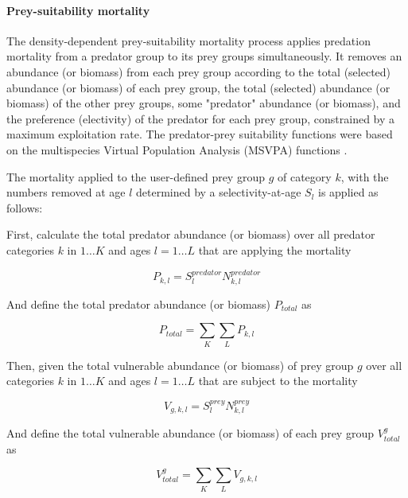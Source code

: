 \paragraph{Prey-suitability mortality}\label{sec:Process-MortalityPreySuitability} 

The density-dependent prey-suitability mortality process applies predation mortality from a predator group to its prey groups simultaneously. It removes an abundance (or biomass) from each prey group according to the total (selected) abundance (or biomass) of each prey group, the total (selected) abundance (or biomass) of the other prey groups, some "predator" abundance (or biomass), and the preference (electivity) of the predator for each prey group, constrained by a maximum exploitation rate. The predator-prey suitability functions were based on the multispecies Virtual Population Analysis (MSVPA) functions \citep{JuradoMolina2005}.

The mortality applied to the user-defined prey group $g$ of category $k$, with the numbers removed at age $l$ determined by a selectivity-at-age $S_l$ is applied as follows:

First, calculate the total predator abundance (or biomass) over all predator categories $k$ in $1 \ldots K$ and ages $l = 1 \ldots L$ that are applying the mortality

\begin{equation}
P_{k,l} = S^{predator}_l N^{predator}_{k,l}
\end{equation}

And define the total predator abundance (or biomass) $P_{total}$ as

\begin{equation}
P_{total}  = \sum\limits_K {\sum\limits_L {P_{k,l}}}
\end{equation}

Then, given the total vulnerable abundance (or biomass) of prey group $g$ over all categories $k$ in $1 \ldots K$ and ages $l = 1 \ldots L$ that are subject to the mortality

\begin{equation}
V_{g,k,l} = S^{prey}_l N^{prey}_{k,l}
\end{equation}

And define the total vulnerable abundance (or biomass) of each prey group $V^g_{total}$ as

\begin{equation}
V^g_{total}  = \sum\limits_K {\sum\limits_L {V_{g,k,l}}}
\end{equation}

